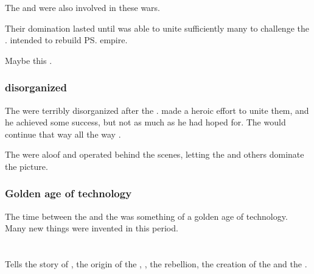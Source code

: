 The \vorcanths{} and \nagae{} were also involved in these wars. 

Their domination lasted until \Nexagglachel{} was able to unite sufficiently many \dragons{} to challenge the \quiljaaran. 
\Nexagglachel{} intended to rebuild \ps{\TyarithXserasshana} empire. 

Maybe this  .









\subsection{\Dragons{} disorganized}
The \dragons{} were terribly disorganized after the \firstbanewar. 
\Nexagglachel{} made a heroic effort to unite them, and he achieved some success, but not as much as he had hoped for. 
The \dragons{} would continue that way all the way . 

The \dragons{} were aloof and operated behind the scenes, letting the \quiljaaran{} and others dominate the picture. 









\subsection{Golden age of technology}
The time between the \firstbanewar{} and the \secondbanewar{} was something of a golden age of technology. 
Many new things were invented in this period. 























\chapter{\AvatarofEntropy}
Tells the story of \Semiza, the origin of the \resphain, \Merkyrah, the \resphan{} rebellion, the creation of the \satharioth{} and the \secondbanewar. 





